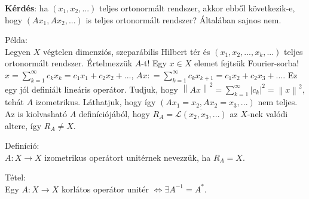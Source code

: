 \documentclass[12pt,a4paper]{scrartcl}
\newenvironment{definicio}{}{}
\newenvironment{tetel}{}{}
\newenvironment{pelda}{}{}
\begin{document}
\textbf{Kérdés}: ha \(\left( {x_{1},x_{2},...} \right)\) teljes
ortonormált rendszer, akkor ebből következik-e, hogy
\(\left( {Ax_{1},Ax_{2},...} \right)\) is teljes ortonormált rendszer?
Általában sajnos nem.

\begin{pelda}

Példa:\\
Legyen \(X\) végtelen dimenziós, szeparábilis Hilbert tér és
\(\left( {x_{1},x_{2},...,x_{k},...} \right)\) teljes ortonormált
rendszer. Értelmezzük \(A\)-t! Egy \(x \in X\) elemet fejtsük
Fourier-sorba!
\(x = {\sum\limits_{k = 1}^{\infty}{c_{k}x_{k}}} = c_{1}x_{1} + c_{2}x_{2} + ...\),
\(Ax: = {\sum\limits_{k = 1}^{\infty}{c_{k}x_{k + 1}}} = c_{1}x_{2} + c_{2}x_{3} + ...\).
Ez egy jól definiált lineáris operátor. Tudjuk, hogy
\(\left\| {Ax} \right\|^{2} = {\sum\limits_{k = 1}^{\infty}\left| c_{k} \right|^{2}} = \left\| x \right\|^{2}\),
tehát \(A\) izometrikus. Láthatjuk, hogy így
\(\left( {Ax_{1} = x_{2},Ax_{2} = x_{3},...} \right)\) nem teljes. Az is
kiolvasható \(A\) definíciójából, hogy
\(R_{A} = \overline{\mathcal{L}\left( {x_{2},x_{3},...} \right)}\) az
\(X\)-nek valódi altere, így \(R_{A} \neq X\).

\end{pelda}

\begin{definicio}

Definíció:\\
\(\left. A:X\rightarrow X \right.\) izometrikus operátort unitérnek
nevezzük, ha \(R_{A} = X\).

\end{definicio}

\begin{tetel}

Tétel:\\
Egy \(\left. A:X\rightarrow X \right.\) korlátos operátor unitér
\(\left. \Leftrightarrow\exists A^{- 1} = A^{*} \right.\).

\end{tetel}
\end{document}
